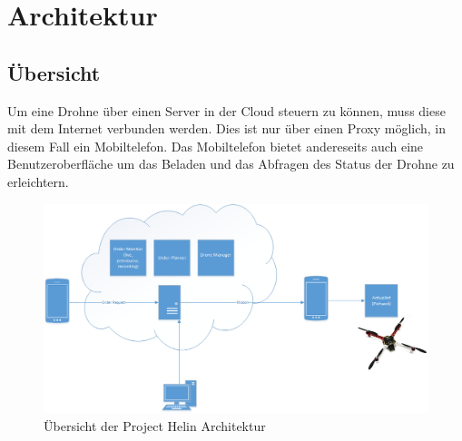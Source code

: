 \chapter{Architektur}

\section{Übersicht}

Um eine Drohne über einen Server in der Cloud steuern zu können, muss diese mit dem Internet verbunden werden. Dies ist nur über einen Proxy möglich, in diesem Fall ein Mobiltelefon. Das Mobiltelefon bietet andereseits auch eine Benutzeroberfläche um das Beladen und das Abfragen des Status der Drohne zu erleichtern. \\

\begin{figure}[h]
	\includegraphics[width=1.0\textwidth]{images/Overview-Diagram.png}
	\caption{Übersicht der Project Helin Architektur }
	\label{fig:architecture-overview}
\end{figure}